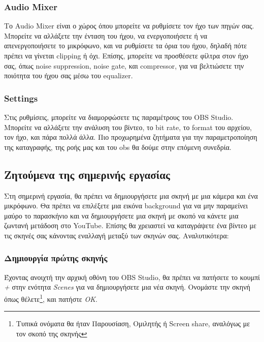 \documentclass[12pt,a4paper]{article}
\begin{document}
\subsubsection{Audio Mixer}
Το Audio Mixer είναι ο χώρος όπου μπορείτε να ρυθμίσετε τον ήχο των πηγών σας. Μπορείτε να αλλάξετε
την ένταση του ήχου, να ενεργοποιήσετε ή να απενεργοποιήσετε το μικρόφωνο, και να ρυθμίσετε τα όρια
του ήχου, δηλαδή πότε πρέπει να γίνεται clipping ή όχι. Επίσης, μπορείτε να προσθέσετε φίλτρα στον ήχο
σας, όπως noise suppression, noise gate, και compressor, για να βελτιώσετε την ποιότητα του ήχου σας μέσω
του equalizer.
\subsubsection{Settings}
Στις ρυθμίσεις, μπορείτε να διαμορφώσετε τις παραμέτρους του OBS Studio. Μπορείτε να αλλάξετε την
ανάλυση του βίντεο, το bit rate, το format του αρχείου, τον ήχο, και πάρα πολλά άλλα. Πιο προχωρημένα
ζητήματα για την παραμετροποίηση της καταγραφής, της ροής μας και του obs θα δούμε στην επόμενη συνεδρία.

\subsection{Ζητούμενα της σημερινής εργασίας}
Στη σημερινή εργασία, θα πρέπει να δημιουργήσετε μια σκηνή με μια κάμερα και ένα μικρόφωνο. Θα πρέπει να
επιλέξετε μια εικόνα background για να μην παραμείνει μαύρο το παρασκήνιο και να δημιουργήσετε μια σκηνή
με σκοπό να κάνετε μια ζωντανή μετάδοση στο YouTube. Επίσης θα χρειαστεί να καταγράψετε ένα βίντεο με τις σκηνές
σας κάνοντας εναλλαγή μεταξύ των σκηνών σας. Αναλυτικότερα:
\subsubsection{Δημιουργία πρώτης σκηνής}
Έχοντας ανοιχτή την αρχική οθόνη του OBS Studio, θα πρέπει να πατήσετε το κουμπί \textit{+} στην ενότητα
\textit{Scenes} για να δημιουργήσετε μια νέα σκηνή. Ονομάστε την σκηνή όπως θέλετε\footnote{Τυπικά ονόματα θα ήταν Παρουσίαση, Ομιλητής ή Screen share, αναλόγως με τον σκοπό της σκηνής}, και πατήστε \textit{OK}.
\end{document}
